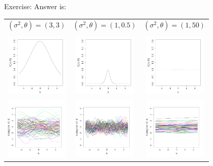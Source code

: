 \documentclass{beamer}
\begin{document}
\begin{frame}{}
\begin{exampleblock}{Exercise: }
Answer is:
\begin{center}
\begin{tabular}{ccc}
$(\sigma^2,\theta) = (3,3)$& $(\sigma^2,\theta)=(1,0.5)$& $(\sigma^2,\theta)=(1,50)$ \\ 
&&\\
\includegraphics[height=3cm]{figures/R/MVN_kern33} &\includegraphics[height=3cm]{figures/R/MVN_kern105}& \includegraphics[height=3cm]{figures/R/MVN_kern150}\\ 
\includegraphics[height=3cm]{figures/R/MVN_traj33} &\includegraphics[height=3cm]{figures/R/MVN_traj105}& \includegraphics[height=3cm]{figures/R/MVN_traj150}
\end{tabular}
\end{center}
\end{exampleblock}
\end{frame}
\end{document}
